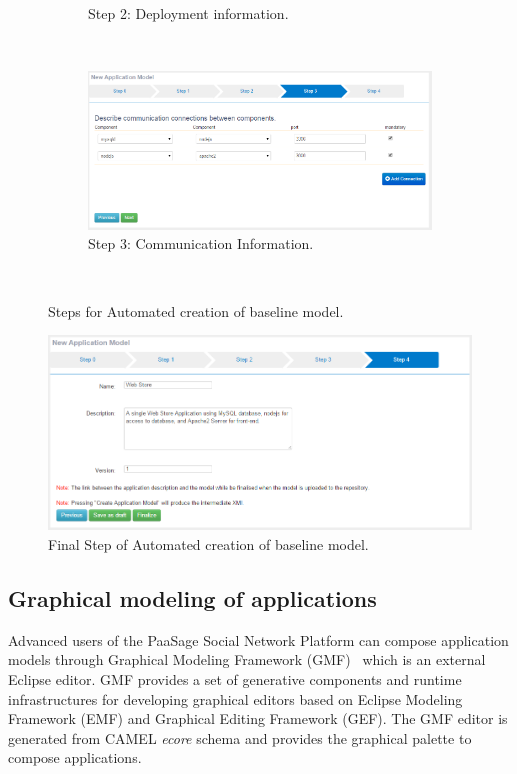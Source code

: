 \begin{figure}
\begin{subfigure}{.8\textwidth}
  \caption{Step 2: Deployment information.}
  \label{fig:sfig2}
\end{subfigure} \\[1ex]
\begin{subfigure}{.8\textwidth}
  \centering
  \includegraphics[scale=0.4]{./fig/model_creation3.png}
  \caption{Step 3: Communication Information.}
  \label{fig:sfig3}
\end{subfigure} \\[1ex]
\caption{Steps for Automated creation of baseline model.}
\label{fig:model_creation_0}
\end{figure}

\begin{figure}
  \centering
  \includegraphics[scale=0.4]{./fig/model_creation4.png}
  \caption{Final Step of Automated creation of baseline model.}
  \label{fig:sfig4}
\end{figure}

\clearpage

\subsection{Graphical modeling of applications}
\label{sec:gmf}

Advanced users of the PaaSage Social Network Platform can compose application models through Graphical Modeling Framework (GMF)~\cite{gmf_url} which is an external Eclipse editor. GMF provides a set of generative components and runtime infrastructures for developing graphical editors based on Eclipse Modeling Framework (EMF) and Graphical Editing Framework (GEF). The GMF editor is generated from CAMEL {\em ecore} schema and provides the graphical palette to compose applications. 

